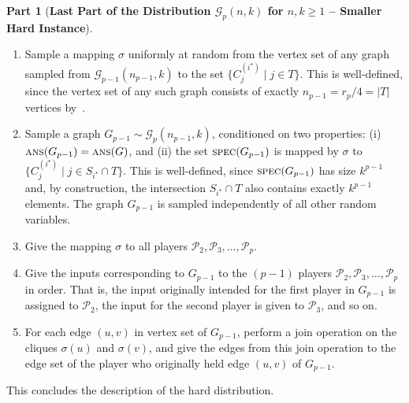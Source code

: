 \documentclass[11pt]{article}
\theoremstyle{definition}
\newenvironment{ourbox}{\begin{mdframed}[hidealllines=false,innerleftmargin=10pt,backgroundcolor=white!10,innertopmargin=5pt,innerbottommargin=5pt,roundcorner=10pt]}{\end{mdframed}}
\newtheorem{mddistributionpart}{Part}
\newenvironment{Part}{\begin{ourbox}\begin{mddistributionpart}}{
		\end{mddistributionpart}
\end{ourbox}}
\renewcommand{\geq}{\geqslant}
\newcommand{\card}[1]{\left\vert{#1}\right\vert}
\newcommand{\player}[1]{\ensuremath{\mathcal{P}_{#1}}}
\newcommand{\cG}{\ensuremath{\mathcal{G}}}
\newcommand{\cliqnum}[2]{\ensuremath{C^{(#1)}_{#2}}}
\newcommand{\ans}{\ensuremath{\textnormal{\textsc{ans}}}}
\newcommand{\spec}{\ensuremath{\textnormal{\textsc{spec}}}}
\newcommand{\istar}{\ensuremath{i^{\star}}}
\begin{document}
	\begin{Part}[\textbf{Last Part of the Distribution $\cG_p(n,k)$ for $n, k \geq 1$ -- Smaller Hard Instance}]\label{distpart:hard-instance}
		~
		\vspace{-15pt}
		\begin{enumerate}[label=$(\roman*)$]	
			\item Sample a mapping $\sigma$ uniformly at random from the vertex set of any graph sampled from $\mathcal{G}_{p-1}(n_{p-1}, k)$ to the set $\{\cliqnum{\istar}{j} \mid j \in T\}$. This is well-defined, since the vertex set of any such graph consists of exactly $n_{p-1} = r_p / 4 = \card{T}$ vertices by~.
			
			\item Sample a graph $G_{p-1} \sim \cG_p(n_{p-1}, k)$, conditioned on two properties: (i) $\ans(G_{p-1}) = \ans(G)$, and (ii) the set $\spec(G_{p-1})$ is mapped by $\sigma$ to $\{\cliqnum{\istar}{j} \mid j \in S_{\istar} \cap T\}$. This is well-defined, since $\spec(G_{p-1})$ has size $k^{p-1}$ and, by construction, the intersection $S_{\istar} \cap T$ also contains exactly $k^{p-1}$ elements. The graph $G_{p-1}$ is sampled independently of all other random variables.
			
			\item Give the mapping $\sigma$ to all players $\player{2}, \player{3}, \ldots, \player{p}$. 
			
			\item Give the inputs corresponding to $G_{p-1}$ to the $(p-1)$ players $\player{2}, \player{3}, \ldots, \player{p}$ in order. That is, the input originally intended for the first player in $G_{p-1}$ is assigned to $\player{2}$, the input for the second player is given to $\player{3}$, and so on.
			
			\item For each edge $(u,v)$ in vertex set of $G_{p-1}$, perform a join operation on the cliques $\sigma(u)$ and $\sigma(v)$, and give the edges from this join operation to the edge set of the player who originally held edge $(u,v)$ of $G_{p-1}$. \label{part:hard-inst-cliqjoin}
		\end{enumerate}
	\end{Part}
	
	This concludes the description of the hard distribution. 
	
	
\end{document}
